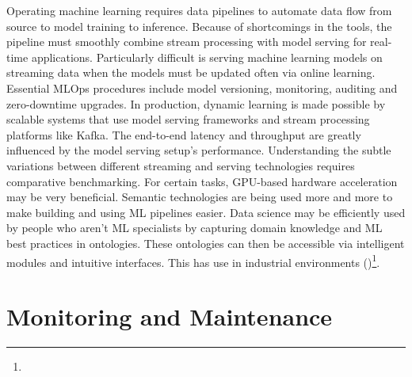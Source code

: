Operating machine learning requires data pipelines to automate data flow from source to model training to inference. Because of shortcomings in the tools, the pipeline must smoothly combine stream processing with model serving for real-time applications. Particularly difficult is serving machine learning models on streaming data when the models must be updated often via online learning. Essential MLOps procedures include model versioning, monitoring, auditing and zero-downtime upgrades. In production, dynamic learning is made possible by scalable systems that use model serving frameworks and stream processing platforms like Kafka. The end-to-end latency and throughput are greatly influenced by the model serving setup's performance. Understanding the subtle variations between different streaming and serving technologies requires comparative benchmarking. For certain tasks, GPU-based hardware acceleration may be very beneficial. Semantic technologies are being used more and more to make building and using ML pipelines easier. Data science may be efficiently used by people who aren't ML specialists by capturing domain knowledge and ML best practices in ontologies. These ontologies can then be accessible via intelligent modules and intuitive interfaces. This has use in industrial environments (\cite{Cdola2021FeatureEA})\footnote[26]{}.

\section{Monitoring and Maintenance}

